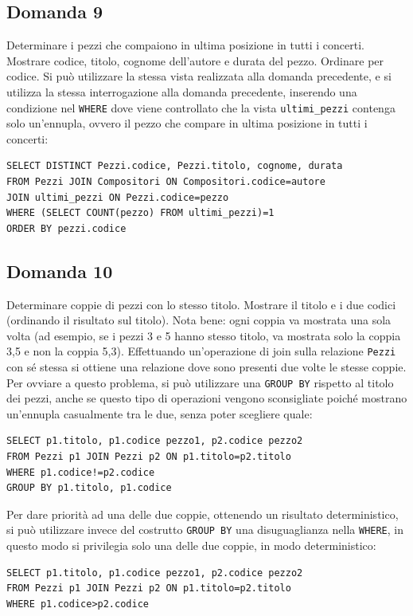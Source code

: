 \documentclass{article}
\numberwithin{equation}{subsection}
\begin{document}
\subsection{Domanda 9}
Determinare i pezzi che compaiono in ultima posizione in tutti i concerti. Mostrare codice, titolo, cognome dell'autore e durata del pezzo. Ordinare per codice. Si può utilizzare la stessa vista realizzata 
alla domanda precedente, e si utilizza la stessa interrogazione alla domanda precedente, inserendo una condizione nel \verb|WHERE| dove viene controllato che la vista \verb|ultimi_pezzi| contenga solo un'ennupla, 
ovvero il pezzo che compare in ultima posizione in tutti i concerti:
\begin{verbatim}
SELECT DISTINCT Pezzi.codice, Pezzi.titolo, cognome, durata
FROM Pezzi JOIN Compositori ON Compositori.codice=autore
JOIN ultimi_pezzi ON Pezzi.codice=pezzo
WHERE (SELECT COUNT(pezzo) FROM ultimi_pezzi)=1
ORDER BY pezzi.codice
\end{verbatim}

\subsection{Domanda 10}
Determinare coppie di pezzi con lo stesso titolo. Mostrare il titolo e i due codici (ordinando il risultato sul titolo). Nota bene: ogni coppia va mostrata una sola volta 
(ad esempio, se i pezzi 3 e 5 hanno stesso titolo, va mostrata solo la coppia 3,5 e non la coppia 5,3). Effettuando un'operazione di join sulla relazione \verb|Pezzi| con sé stessa si ottiene una relazione dove sono 
presenti due volte le stesse coppie. Per ovviare a questo problema, si può utilizzare una \verb|GROUP BY| rispetto al titolo dei pezzi, anche se questo tipo di operazioni vengono sconsigliate poiché mostrano 
un'ennupla casualmente tra le due, senza poter scegliere quale:
\begin{verbatim}
SELECT p1.titolo, p1.codice pezzo1, p2.codice pezzo2
FROM Pezzi p1 JOIN Pezzi p2 ON p1.titolo=p2.titolo
WHERE p1.codice!=p2.codice
GROUP BY p1.titolo, p1.codice
\end{verbatim}

Per dare priorità ad una delle due coppie, ottenendo un risultato deterministico, si può utilizzare invece del costrutto \verb|GROUP BY| una 
disuguaglianza nella \verb|WHERE|, in questo modo si privilegia solo una delle due coppie, in modo deterministico:
\begin{verbatim}
SELECT p1.titolo, p1.codice pezzo1, p2.codice pezzo2
FROM Pezzi p1 JOIN Pezzi p2 ON p1.titolo=p2.titolo
WHERE p1.codice>p2.codice
\end{verbatim}
\end{document}
